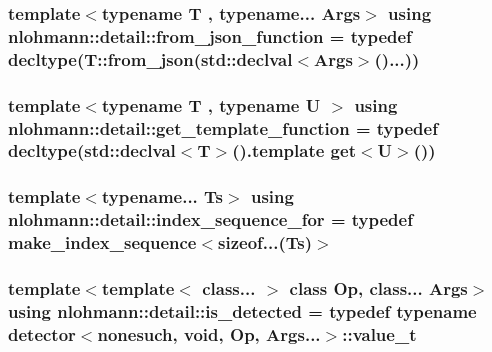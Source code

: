 \subsubsection[{\texorpdfstring{from\+\_\+json\+\_\+function}{from_json_function}}]{\setlength{\rightskip}{0pt plus 5cm}template$<$typename T , typename... Args$>$ using {\bf nlohmann\+::detail\+::from\+\_\+json\+\_\+function} = typedef decltype(T\+::from\+\_\+json(std\+::declval$<$Args$>$()...))}\hypertarget{namespacenlohmann_1_1detail_a1711ee5cef66a0523055c8d9f024f322}{}\label{namespacenlohmann_1_1detail_a1711ee5cef66a0523055c8d9f024f322}
\subsubsection[{\texorpdfstring{get\+\_\+template\+\_\+function}{get_template_function}}]{\setlength{\rightskip}{0pt plus 5cm}template$<$typename T , typename U $>$ using {\bf nlohmann\+::detail\+::get\+\_\+template\+\_\+function} = typedef decltype(std\+::declval$<$T$>$().template {\bf get}$<$U$>$())}\hypertarget{namespacenlohmann_1_1detail_ab4d22cdb6521ee3508db496dea66711e}{}\label{namespacenlohmann_1_1detail_ab4d22cdb6521ee3508db496dea66711e}
\subsubsection[{\texorpdfstring{index\+\_\+sequence\+\_\+for}{index_sequence_for}}]{\setlength{\rightskip}{0pt plus 5cm}template$<$typename... Ts$>$ using {\bf nlohmann\+::detail\+::index\+\_\+sequence\+\_\+for} = typedef {\bf make\+\_\+index\+\_\+sequence}$<$sizeof...(Ts)$>$}\hypertarget{namespacenlohmann_1_1detail_a24800493c6ec02ce033dcbb47b7fd28e}{}\label{namespacenlohmann_1_1detail_a24800493c6ec02ce033dcbb47b7fd28e}
\subsubsection[{\texorpdfstring{is\+\_\+detected}{is_detected}}]{\setlength{\rightskip}{0pt plus 5cm}template$<$template$<$ class... $>$ class Op, class... Args$>$ using {\bf nlohmann\+::detail\+::is\+\_\+detected} = typedef typename {\bf detector}$<${\bf nonesuch}, {\bf void}, Op, Args...$>$\+::{\bf value\+\_\+t}}\hypertarget{namespacenlohmann_1_1detail_a9135fcf616d6ac6e231a86e0a055ac44}{}\label{namespacenlohmann_1_1detail_a9135fcf616d6ac6e231a86e0a055ac44}
